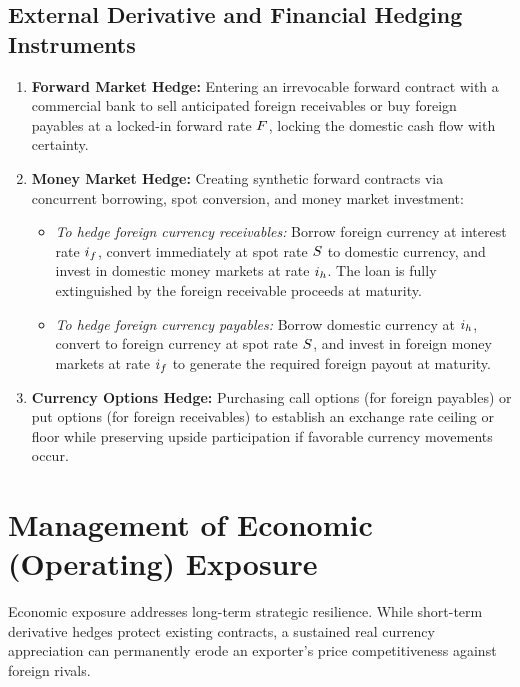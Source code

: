 \subsection{External Derivative and Financial Hedging Instruments}
\begin{enumerate}[leftmargin=1.5em]
    \item \textbf{Forward Market Hedge:} Entering an irrevocable forward contract with a commercial bank to sell anticipated foreign receivables or buy foreign payables at a locked-in forward rate $F$, locking the domestic cash flow with certainty.
    \item \textbf{Money Market Hedge:} Creating synthetic forward contracts via concurrent borrowing, spot conversion, and money market investment:
    \begin{itemize}[noitemsep]
        \item \textit{To hedge foreign currency receivables:} Borrow foreign currency at interest rate $i_f$, convert immediately at spot rate $S$ to domestic currency, and invest in domestic money markets at rate $i_h$. The loan is fully extinguished by the foreign receivable proceeds at maturity.
        \item \textit{To hedge foreign currency payables:} Borrow domestic currency at $i_h$, convert to foreign currency at spot rate $S$, and invest in foreign money markets at rate $i_f$ to generate the required foreign payout at maturity.
    \end{itemize}
    \item \textbf{Currency Options Hedge:} Purchasing call options (for foreign payables) or put options (for foreign receivables) to establish an exchange rate ceiling or floor while preserving upside participation if favorable currency movements occur.
\end{enumerate}

\vspace{0.5em}

\section{Management of Economic (Operating) Exposure}
\label{sec:economic_exposure}

Economic exposure addresses long-term strategic resilience. While short-term derivative hedges protect existing contracts, a sustained real currency appreciation can permanently erode an exporter's price competitiveness against foreign rivals.

